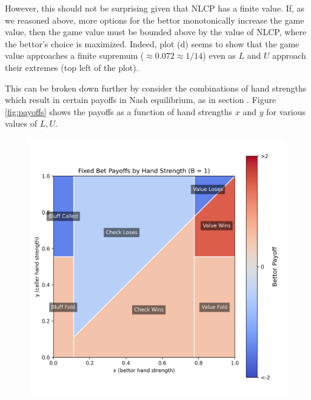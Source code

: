 \documentclass[a4paper,12pt]{article}
\theoremstyle{plain}
\theoremstyle{definition}
\begin{document}
However, this should not be surprising given that NLCP has a finite value. If, as we reasoned above, more options for the bettor monotonically increase the game value, then the game value must be bounded above by the value of NLCP, where the bettor's choice is maximized. Indeed, plot (d) seems to show that the game value approaches a finite supremum ($\approx 0.072\approx 1/14$) even as $L$ and $U$ approach their extremes (top left of the plot).  

This can be broken down further by consider the combinations of hand strengths which result in certain payoffs in Nash equilibrium, as in section . Figure \ref{fig:payoffs} shows the payoffs as a function of hand strengths $x$ and $y$ for various values of $L, U$. 


\begin{figure}[h!]
    \begin{adjustwidth}{-1in}{-1in}
        \centering
        \begin{minipage}{0.4\textwidth}
            \centering
            \includegraphics[width=\textwidth]{payoff_fixed_bet_heatmap.png}
        \end{minipage}
        \hspace{0.02\textwidth}

\end{adjustwidth}
\end{figure}
\end{document}

